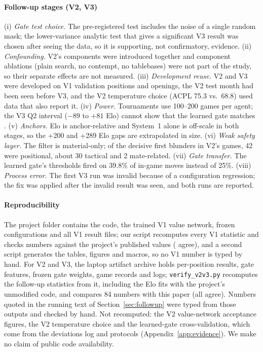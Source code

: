 \paragraph*{Follow-up stages (V2, V3)}
(i) \emph{Gate test choice.} The pre-registered test includes the noise of a single random mask; the lower-variance analytic test that gives a significant V3 result was chosen after seeing the data, so it is supporting, not confirmatory, evidence. (ii) \emph{Confounding.} V2's components were introduced together and component ablations (plain search, no contempt, no tablebases) were not part of the study, so their separate effects are not measured. (iii) \emph{Development reuse.} V2 and V3 were developed on V1 validation positions and openings, the V2 test month had been seen before V3, and the V2 temperature choice (ACPL 75.3 vs.\ 68.8) used data that also report it. (iv) \emph{Power.} Tournaments use 100--200 games per agent; the V3 Q2 interval ($-89$ to $+81$ Elo) cannot show that the learned gate matches . (v) \emph{Anchors.} Elo is anchor-relative and System~1 alone is off-scale in both stages, so the +200 and +289 Elo gaps are extrapolated in size. (vi) \emph{Weak safety layer.} The filter is material-only; of the decisive first blunders in V2's games, 42 were positional, about 30 tactical and 2 mate-related. (vii) \emph{Gate transfer.} The learned gate's thresholds fired on 39.8\% of in-game moves instead of 25\%. (viii) \emph{Process error.} The first V3 run was invalid because of a configuration regression; the fix was applied after the invalid result was seen, and both runs are reported.

\paragraph*{Reproducibility}
The project folder contains the code, the trained V1 value network, frozen configurations and all V1 result files; our script recomputes every V1 statistic and checks \nChecks{} numbers against the project's published values (\nChecksOk{} agree), and a second script generates the tables, figures and macros, so no V1 number is typed by hand. For V2 and V3, the laptop artifact archive holds per-position results, gate features, frozen gate weights, game records and logs; \texttt{verify\_v2v3.py} recomputes the follow-up statistics from it, including the Elo fits with the project's unmodified code, and compares 84 numbers with this paper (all agree). Numbers quoted in the running text of Section~\ref{sec:followup} were typed from those outputs and checked by hand. Not recomputed: the V2 value-network acceptance figures, the V2 temperature choice and the learned-gate cross-validation, which come from the deviations log and protocols (Appendix~\ref{app:evidence}). We make no claim of public code availability.

